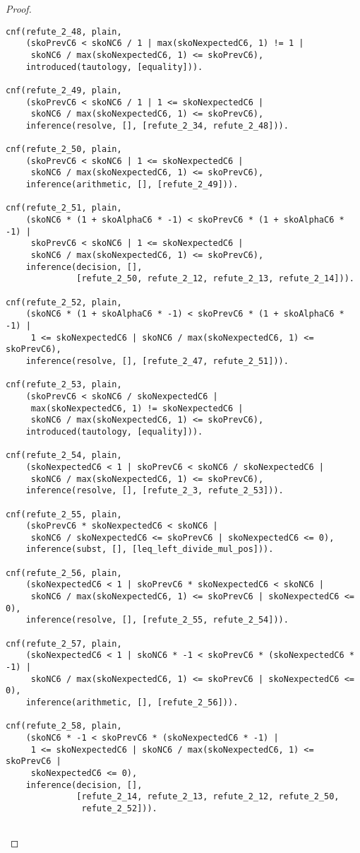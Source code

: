 \begin{proof}
\begin{verbatim}
cnf(refute_2_48, plain,
    (skoPrevC6 < skoNC6 / 1 | max(skoNexpectedC6, 1) != 1 |
     skoNC6 / max(skoNexpectedC6, 1) <= skoPrevC6),
    introduced(tautology, [equality])).

cnf(refute_2_49, plain,
    (skoPrevC6 < skoNC6 / 1 | 1 <= skoNexpectedC6 |
     skoNC6 / max(skoNexpectedC6, 1) <= skoPrevC6),
    inference(resolve, [], [refute_2_34, refute_2_48])).

cnf(refute_2_50, plain,
    (skoPrevC6 < skoNC6 | 1 <= skoNexpectedC6 |
     skoNC6 / max(skoNexpectedC6, 1) <= skoPrevC6),
    inference(arithmetic, [], [refute_2_49])).

cnf(refute_2_51, plain,
    (skoNC6 * (1 + skoAlphaC6 * -1) < skoPrevC6 * (1 + skoAlphaC6 * -1) |
     skoPrevC6 < skoNC6 | 1 <= skoNexpectedC6 |
     skoNC6 / max(skoNexpectedC6, 1) <= skoPrevC6),
    inference(decision, [],
              [refute_2_50, refute_2_12, refute_2_13, refute_2_14])).

cnf(refute_2_52, plain,
    (skoNC6 * (1 + skoAlphaC6 * -1) < skoPrevC6 * (1 + skoAlphaC6 * -1) |
     1 <= skoNexpectedC6 | skoNC6 / max(skoNexpectedC6, 1) <= skoPrevC6),
    inference(resolve, [], [refute_2_47, refute_2_51])).

cnf(refute_2_53, plain,
    (skoPrevC6 < skoNC6 / skoNexpectedC6 |
     max(skoNexpectedC6, 1) != skoNexpectedC6 |
     skoNC6 / max(skoNexpectedC6, 1) <= skoPrevC6),
    introduced(tautology, [equality])).

cnf(refute_2_54, plain,
    (skoNexpectedC6 < 1 | skoPrevC6 < skoNC6 / skoNexpectedC6 |
     skoNC6 / max(skoNexpectedC6, 1) <= skoPrevC6),
    inference(resolve, [], [refute_2_3, refute_2_53])).

cnf(refute_2_55, plain,
    (skoPrevC6 * skoNexpectedC6 < skoNC6 |
     skoNC6 / skoNexpectedC6 <= skoPrevC6 | skoNexpectedC6 <= 0),
    inference(subst, [], [leq_left_divide_mul_pos])).

cnf(refute_2_56, plain,
    (skoNexpectedC6 < 1 | skoPrevC6 * skoNexpectedC6 < skoNC6 |
     skoNC6 / max(skoNexpectedC6, 1) <= skoPrevC6 | skoNexpectedC6 <= 0),
    inference(resolve, [], [refute_2_55, refute_2_54])).

cnf(refute_2_57, plain,
    (skoNexpectedC6 < 1 | skoNC6 * -1 < skoPrevC6 * (skoNexpectedC6 * -1) |
     skoNC6 / max(skoNexpectedC6, 1) <= skoPrevC6 | skoNexpectedC6 <= 0),
    inference(arithmetic, [], [refute_2_56])).

cnf(refute_2_58, plain,
    (skoNC6 * -1 < skoPrevC6 * (skoNexpectedC6 * -1) |
     1 <= skoNexpectedC6 | skoNC6 / max(skoNexpectedC6, 1) <= skoPrevC6 |
     skoNexpectedC6 <= 0),
    inference(decision, [],
              [refute_2_14, refute_2_13, refute_2_12, refute_2_50,
               refute_2_52])).


\end{verbatim}
\end{proof}
